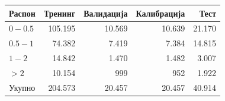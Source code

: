 \begin{tabular}{lrrrr}
\toprule
Распон & Тренинг & Валидација & Калибрација & Тест \\
\midrule
$0-0.5$ & 105.195 & 10.569 & 10.639 & 21.170 \\
$0.5-1$ & 74.382 & 7.419 & 7.384 & 14.815 \\
$1-2$ & 14.842 & 1.470 & 1.482 & 3.007 \\
$>2$ & 10.154 & 999 & 952 & 1.922 \\
\midrule
Укупно & 204.573 & 20.457 & 20.457 & 40.914 \\
\bottomrule
\end{tabular}